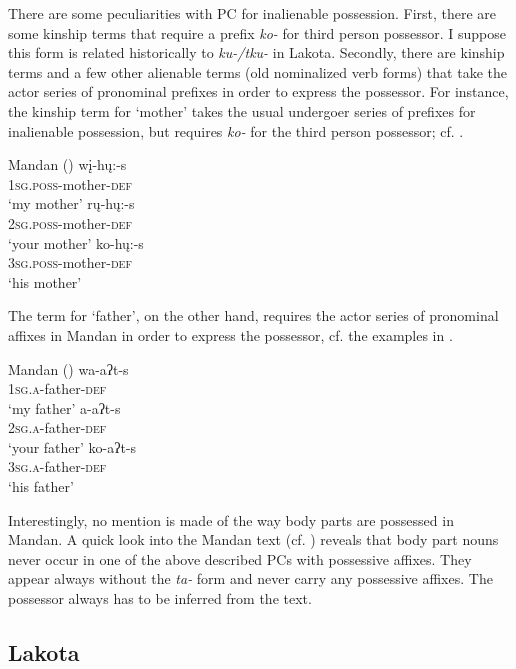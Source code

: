 \documentclass[output=paper]{LSP/langsci}
\begin{document}
There are some peculiarities with PC for inalienable possession. First, there are some kinship terms that require a prefix \textit{ko-} for third person possessor. I suppose this form is related historically to \textit{ku-/tku-} in Lakota. Secondly, there are kinship terms and a few other alienable terms (old nominalized verb forms) that take the actor series of pronominal prefixes in order to express the possessor. For instance, the kinship term for `mother' takes the usual undergoer series of prefixes for inalienable possession, but requires \textit{ko-} for the third person possessor; cf. . 

\ea Mandan (\citealt[45]{Mixco1997}) \label{mandanmother}
\ea
\gll wį-hų:-s \\			
\textsc{1sg.poss}-mother-\textsc{def} \\
\glt `my mother'
\ex \gll rų-hų:-s \\
\textsc{2sg.poss}-mother-\textsc{def} \\
\glt `your mother'
\ex \gll ko-hų:-s \\
\textsc{3sg.poss}-mother-\textsc{def} \\
\glt `his mother'
\z \z

The term for `father', on the other hand, requires the actor series of pronominal affixes in Mandan in order to express the possessor, cf. the examples in .

\ea Mandan (\citealt[45]{Mixco1997}) \label{mandanfather}
\ea \gll wa-aʔt-s \\
\textsc{1sg.a}-father-\textsc{def} \\
\glt `my father'
\ex \gll a-aʔt-s \\
\textsc{2sg.a}-father-\textsc{def} \\
\glt `your father'
\ex \gll ko-aʔt-s \\
\textsc{3sg.a}-father-\textsc{def} \\
\glt `his father'
\z \z

Interestingly, no mention is made of the way body parts are possessed in Mandan. A quick look into the Mandan text (cf. \citealt[66ff]{Mixco1997}) reveals that body part nouns never occur in one of the above described PCs with possessive affixes. They appear always without the \textit{ta-} form and never carry any possessive affixes. The possessor always has to be inferred from the text.

\subsection{Lakota}\label{sec:helmbrecht:4.4}
\end{document}
